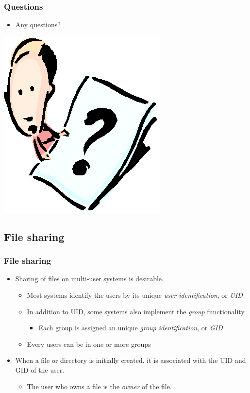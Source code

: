 \documentclass[CJKutf8,xcolor=pdftex,dvipsnames,table]{beamer}
\begin{document}
\begin{CJK*}{UTF8}{song}
  \begin{frame}
    \frametitle{Questions}
    \begin{itemize}
    \item Any questions?
    \end{itemize}
    \begin{center}
      \includegraphics[scale=.5]{question}
    \end{center}
  \end{frame}

  \subsection{File sharing}

  \begin{frame}
    \frametitle{File sharing} \pause
    \begin{itemize}
    \item Sharing of files on multi-user systems is desirable. \pause
      \begin{itemize}
      \item Most systems identify the users by its unique \emph{user identification}, or \emph{UID} \pause
      \item In addition to UID, some systems also implement the \emph{group} functionality \pause
        \begin{itemize}
        \item Each group is assigned an unique \emph{group identification}, or \emph{GID} \pause
        \end{itemize}
      \item Every users can be in one or more groups \pause
      \end{itemize}
    \item When a file or directory is initially created, it is associated with the UID and GID of the user. \pause
      \begin{itemize}
      \item The user who owns a file is the \emph{owner} of the file.
      \end{itemize}
    \end{itemize}
  \end{frame}


\end{CJK*}
\end{document}
